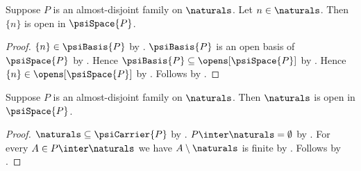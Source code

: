 \begin{proposition}\label{psi_natural_point_isolated}
    Suppose $P$ is an almost-disjoint family on $\naturals$.
    Let $n\in\naturals$.
    Then $\{n\}$ is open in $\psiSpace{P}$.
\end{proposition}
\begin{proof}
    $\{n\}\in\psiBasis{P}$ by .
    $\psiBasis{P}$ is an open basis of $\psiSpace{P}$
        by .
    Hence $\psiBasis{P}\subseteq\opens[\psiSpace{P}]$
        by .
    Hence $\{n\}\in\opens[\psiSpace{P}]$ by .
    Follows by .
\end{proof}

\begin{proposition}\label{psi_naturals_open}
    Suppose $P$ is an almost-disjoint family on $\naturals$.
    Then $\naturals$ is open in $\psiSpace{P}$.
\end{proposition}
\begin{proof}
    $\naturals\subseteq\psiCarrier{P}$
        by .
    $P\inter\naturals=\emptyset$
        by .
    For every $A\in P\inter\naturals$ we have
        $A\setminus\naturals$ is finite by .
    Follows by .
\end{proof}

